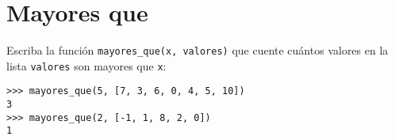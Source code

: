 \section{Mayores que}

Escriba la función \lstinline!mayores_que(x, valores)! que cuente
cuántos valores en la lista \lstinline!valores! son mayores que
\lstinline!x!:

\begin{lstlisting}
>>> mayores_que(5, [7, 3, 6, 0, 4, 5, 10])
3
>>> mayores_que(2, [-1, 1, 8, 2, 0])
1
\end{lstlisting}

